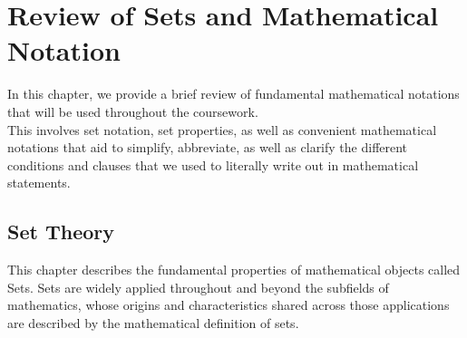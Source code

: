 \chapter{Review of Sets and Mathematical Notation}
In this chapter, we provide a brief review of fundamental mathematical notations that will be used throughout the coursework. \\
This involves set notation, set properties, as well as convenient mathematical notations that aid to simplify, abbreviate, as well as clarify the different conditions and clauses that we used to literally write out in mathematical statements.

\section{Set Theory}
This chapter describes the fundamental properties of mathematical objects called Sets. Sets are widely applied throughout and beyond the subfields of mathematics, whose origins and characteristics shared across those applications are described by the mathematical definition of sets.

